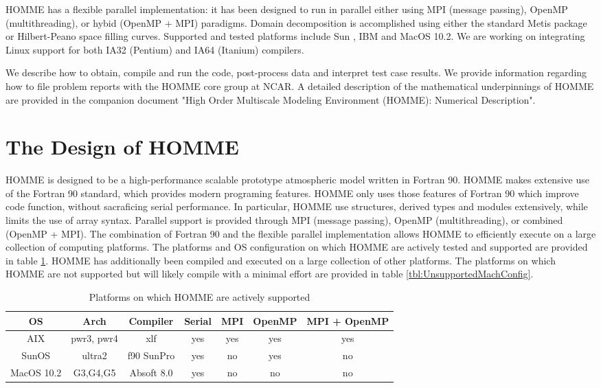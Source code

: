 \documentclass[12pt]{article}
\numberwithin{equation}{section}
\begin{document}
HOMME  has a flexible parallel implementation: it has been designed to run in parallel either using MPI (message passing), OpenMP (multithreading), or hybid (OpenMP + MPI)   paradigms.  Domain decomposition is accomplished  using either the standard Metis package or Hilbert-Peano space filling curves. Supported and tested platforms include Sun , IBM and MacOS 10.2. We are working on integrating Linux support for both IA32 (Pentium) and IA64 (Itanium) compilers.

We describe how to obtain, compile and run the code, post-process data and interpret test case results. We provide information regarding how to file problem reports with the HOMME core group at NCAR.  A detailed description of the mathematical underpinnings of HOMME are provided in the companion document "High Order Multiscale Modeling Environment (HOMME): Numerical Description".

\section{The Design of HOMME}
	
	HOMME is designed to be a high-performance scalable prototype atmospheric model written in Fortran 90. HOMME makes extensive use of the Fortran 90 standard, which provides modern programing features.  HOMME only uses those features of Fortran 90 which improve code function, without sacraficing serial performance.  In particular, HOMME use structures, derived types and modules extensively, while limits the use of array syntax.  Parallel support is provided through MPI (message passing), OpenMP (multithreading), or combined (OpenMP + MPI).  The combination of Fortran 90 and the flexible parallel implementation allows HOMME to efficiently execute on a large collection of computing platforms.  The platforms and OS configuration on which HOMME are actively tested and supported are provided in table \ref{tbl:SupportedMachConfig}.  HOMME has additionally been compiled and executed on a large collection of other platforms.  The platforms on which HOMME are not supported but will likely compile with a minimal effort are provided in table \ref{tbl:UnsupportedMachConfig}.
	
	
\begin{table}[bht]
\begin{center}

\end{center}
\begin{tabular}{|c|c|c|c|c|c|c|} \hline
OS & Arch & Compiler & Serial & MPI & OpenMP &  MPI + OpenMP \\ \hline \hline
AIX & pwr3, pwr4  & xlf              & yes         & yes  & yes           & yes \\ \hline
SunOS & ultra2 & f90 SunPro & yes & no    & yes           & no \\ \hline
MacOS 10.2 & G3,G4,G5 & Absoft 8.0 & yes & no & no & no \\ \hline \hline
\end{tabular}
\caption{Platforms on which HOMME are actively supported}
\label{tbl:SupportedMachConfig}
\end{table}
\end{document}
